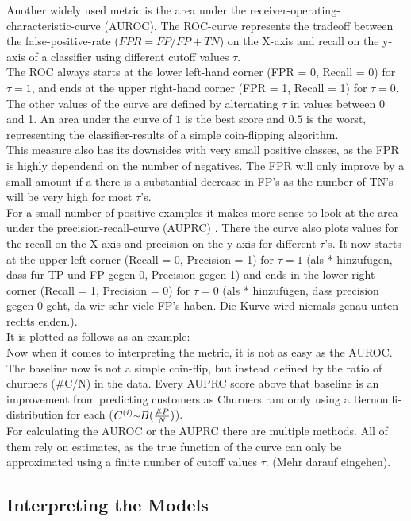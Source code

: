 \documentclass[12pt,titlepage]{article}
\begin{document}
Another widely used metric is the area under the receiver-operating-characteristic-curve (AUROC). The ROC-curve represents the tradeoff between the false-positive-rate ($FPR=FP/FP+TN$) on the X-axis and recall on the y-axis of a classifier using different cutoff values $\tau$. \\
The ROC always starts at the lower left-hand corner (FPR = 0, Recall = 0) for $\tau=1$, and ends at the upper right-hand corner (FPR = 1, Recall = 1) for $\tau=0$. The other values of the curve are defined by alternating $\tau$ in values between 0 and 1. An area under the curve of $1$ is the best score and $0.5$ is the worst, representing the classifier-results of a simple coin-flipping algorithm. \\
This measure also has its downsides with very small positive classes, as the FPR is highly dependend on the number of negatives. The FPR will only improve by a small amount if a there is a substantial decrease in FP's as the number of TN's will be very high for most $\tau$'s. \\
For a small number of positive examples it makes more sense to look at the area under the precision-recall-curve (AUPRC) \cite{auprc}. There the curve also plots values for the recall on the X-axis and precision on the y-axis for different $\tau$'s. It now starts at the upper left corner (Recall = 0, Precision = 1) for $\tau=1$ (als * hinzufügen, dass für TP und FP gegen 0, Precision gegen 1) and ends in the lower right corner (Recall = 1, Precision = 0) for $\tau=0$ (als * hinzufügen, dass precision gegen 0 geht, da wir sehr viele FP's haben. Die Kurve wird niemals genau unten rechts enden.). \\
It is plotted as follows as an example:\\
Now when it comes to interpreting the metric, it is not as easy as the AUROC. The baseline now is not a simple coin-flip, but instead defined by the ratio of churners (\#C/N) in the data. Every AUPRC score above that baseline is an improvement from predicting customers as Churners randomly using a Bernoulli-distribution for each ($C^{(i)}{\raise.17ex\hbox{$\scriptstyle\mathtt{\sim}$}} B(\frac{\#P}{N})$). \\
For calculating the AUROC or the AUPRC there are multiple methods. All of them rely on estimates, as the true function of the curve can only be approximated using a finite number of cutoff values $\tau$. (Mehr darauf eingehen). \\


\subsection{Interpreting the Models} \par
\label{section:interpreting}
\end{document}
